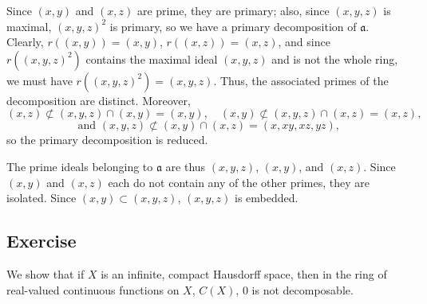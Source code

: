 Since $(x,y)$ and $(x,z)$ are prime, they are primary; also, since $(x,y,z)$ is maximal, $(x,y,z)^2$ is primary, so we have a primary decomposition of $\mathfrak{a}$. Clearly,
$r((x,y)) = (x,y)$, $r((x,z)) = (x,z)$, and since $r((x,y,z)^2)$ contains the maximal ideal $(x,y,z)$ and is not the whole ring, we must have $r((x,y,z)^2) = (x,y,z)$. Thus, the
associated primes of the decomposition are distinct. Moreover,
$$(x,z) \not\subset (x,y,z) \cap (x,y) = (x,y), \quad (x,y) \not\subset (x,y,z) \cap (x,z) = (x,z),$$
$$\text{ and } (x,y,z) \not\subset (x,y)\cap(x,z) = (x,xy,xz,yz),$$
so the primary decomposition is reduced.

The prime ideals belonging to $\mathfrak{a}$ are thus $(x,y,z)$, $(x,y)$, and $(x,z)$. Since $(x,y)$ and $(x,z)$ each do not contain any of the other primes, they are isolated. Since
$(x,y) \subset (x,y,z)$, $(x,y,z)$ is embedded.

\subsection{Exercise}\label{4.6}

We show that if $X$ is an infinite, compact Hausdorff space, then in the ring of real-valued continuous functions on $X$, $C(X)$, $0$ is not decomposable.

